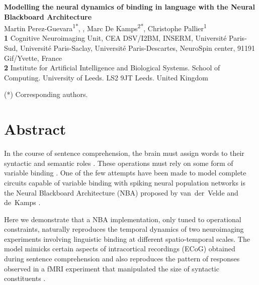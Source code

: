 \documentclass[10pt]{article}
\date{}
\begin{document}
\vspace*{0.2in}

\begin{flushleft} {\LARGE \textbf{Modelling the neural dynamics of
      binding in language with the Neural Blackboard Architecture} }
  \newline
  \\

  Martin Perez-Guevara\textsuperscript{1*}, , Marc De Kamps\textsuperscript{2*}, Christophe Pallier\textsuperscript{1}
  \\
  \bigskip \textbf{1} Cognitive Neuroimaging Unit, CEA DSV/I2BM,
  INSERM, Université Paris-Sud, Université Paris-Saclay,
  Université Paris-Descartes, NeuroSpin center, 91191 Gif/Yvette, France
  \\
  \textbf{2} Institute for Artificial Intelligence and Biological
  Systems. School of Computing. University of Leeds. LS2 9JT Leeds.
  United Kingdom
  \\
  \bigskip


(*) Corresponding authors.
  
\end{flushleft}


\section*{Abstract}

In the course of sentence comprehension, the brain must assign words to their syntactic and semantic roles \cite{smolensky2006harmonic,Jackendoff_2002b}. These operations must rely on some form of variable binding \cite{marcus14}.
One of the few attempts have been made to model complete circuits capable of variable binding with spiking neural population networks is the Neural Blackboard Architecture (NBA) proposed by van~der~Velde and de~Kamps \cite{van_der_Velde_2006}.

Here we demonstrate that a NBA implementation, only tuned to operational constraints, naturally reproduces the temporal dynamics of two neuroimaging experiments involving linguistic binding at different spatio-temporal scales. 
The model mimicks certain aspects of intracortical recordings (ECoG) obtained during sentence comprehension \cite{Nelson_2017} and also reproduces the pattern of responses observed in a fMRI experiment that manipulated the size of syntactic constituents \cite{Pallier_2011}.
\end{document}

